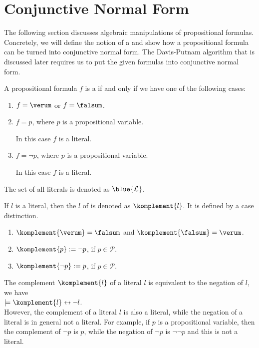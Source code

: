\section{Conjunctive Normal Form}
The following section discusses algebraic manipulations of propositional formulas.  Concretely, we will define
the notion of a  and show how a propositional formula can be turned into
conjunctive normal form.  The Davis-Putnam algorithm that is discussed later requires us to put the given
formulas into conjunctive normal form.

\begin{Definition}[Literal]
  A propositional formula $f$ is a  if and only if we have one of the following cases: 
  \begin{enumerate}
  \item $f = \verum$ or $f = \falsum$.
  \item $f = p$, where $p$ is a propositional variable.

        In this case $f$ is a  literal.
  \item $f = \neg p$, where $p$ is a propositional variable. 

        In this case $f$ is a  literal.
  \end{enumerate}
  The set of all literals is denoted as  $\blue{\mathcal{L}}$.  \eox
\end{Definition}

If  $l$ is a literal, then the  $l$ of is denoted as $\komplement{l}$.
It is defined by a case distinction.
\begin{enumerate}
\item $\komplement{\verum} = \falsum$ \quad and \quad $\komplement{\falsum} = \verum$. 
\item $\komplement{p} := \neg p$, \quad if $p \in \mathcal{P}$.
\item $\komplement{\neg p} := p$, \quad if $p \in \mathcal{P}$.
\end{enumerate}
The complement $\komplement{l}$ of a literal $l$ is equivalent to the negation of $l$, we have
\\[0.2cm]
\hspace*{1.3cm}
$\models \komplement{l} \leftrightarrow \neg l$.
\\[0.2cm]
However, the complement of a literal $l$ is also a literal, while the negation of a literal is in general not a
literal. For example, if $p$ is a propositional variable, then the complement of $\neg p$ is $p$, while the
negation of $\neg p$ is $\neg \neg p$ and this is not a literal.

